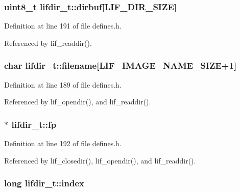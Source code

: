 \subsubsection[{\texorpdfstring{dirbuf}{dirbuf}}]{\setlength{\rightskip}{0pt plus 5cm}uint8\+\_\+t lifdir\+\_\+t\+::dirbuf\mbox{[}{\bf L\+I\+F\+\_\+\+D\+I\+R\+\_\+\+S\+I\+ZE}\mbox{]}}\hypertarget{structlifdir__t_a993ecf6e2652f0e12d56f96a34b806e1}{}\label{structlifdir__t_a993ecf6e2652f0e12d56f96a34b806e1}


Definition at line 191 of file defines.\+h.



Referenced by lif\+\_\+readdir().

\subsubsection[{\texorpdfstring{filename}{filename}}]{\setlength{\rightskip}{0pt plus 5cm}char lifdir\+\_\+t\+::filename\mbox{[}{\bf L\+I\+F\+\_\+\+I\+M\+A\+G\+E\+\_\+\+N\+A\+M\+E\+\_\+\+S\+I\+ZE}+1\mbox{]}}\hypertarget{structlifdir__t_a21bfa7a6d54009982cc63962951ba615}{}\label{structlifdir__t_a21bfa7a6d54009982cc63962951ba615}


Definition at line 189 of file defines.\+h.



Referenced by lif\+\_\+opendir(), and lif\+\_\+readdir().

\subsubsection[{\texorpdfstring{fp}{fp}}]{$\ast$ lifdir\+\_\+t\+::fp}\hypertarget{structlifdir__t_ad764305f0b8c8b95ea0f0690530babcb}{}\label{structlifdir__t_ad764305f0b8c8b95ea0f0690530babcb}


Definition at line 192 of file defines.\+h.



Referenced by lif\+\_\+closedir(), lif\+\_\+opendir(), and lif\+\_\+readdir().

\subsubsection[{\texorpdfstring{index}{index}}]{\setlength{\rightskip}{0pt plus 5cm}long lifdir\+\_\+t\+::index}\hypertarget{structlifdir__t_a7b9b45ee1a56ba386158da051605a8bd}{}\label{structlifdir__t_a7b9b45ee1a56ba386158da051605a8bd}



